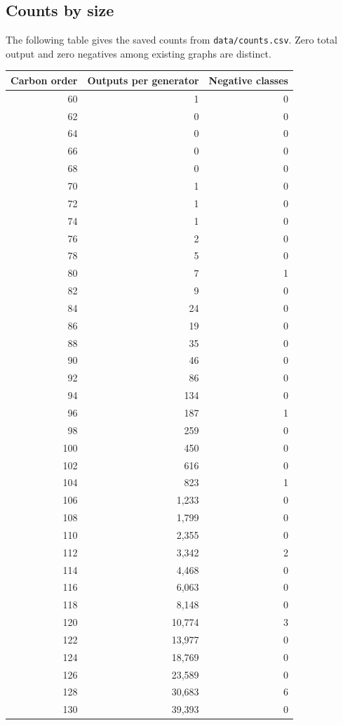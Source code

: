 \documentclass[11pt]{amsart}
\newcommand{\record}[1]{\nolinkurl{#1}}
\begin{document}
\subsection{Counts by size}
The following table gives the saved counts from \record{data/counts.csv}.
Zero total output and zero negatives among existing graphs are distinct.
\begin{longtable}{rrr}
\toprule Carbon order & Outputs per generator & Negative classes\\\midrule\endhead
60 & 1 & 0 \\
62 & 0 & 0 \\
64 & 0 & 0 \\
66 & 0 & 0 \\
68 & 0 & 0 \\
70 & 1 & 0 \\
72 & 1 & 0 \\
74 & 1 & 0 \\
76 & 2 & 0 \\
78 & 5 & 0 \\
80 & 7 & 1 \\
82 & 9 & 0 \\
84 & 24 & 0 \\
86 & 19 & 0 \\
88 & 35 & 0 \\
90 & 46 & 0 \\
92 & 86 & 0 \\
94 & 134 & 0 \\
96 & 187 & 1 \\
98 & 259 & 0 \\
100 & 450 & 0 \\
102 & 616 & 0 \\
104 & 823 & 1 \\
106 & 1,233 & 0 \\
108 & 1,799 & 0 \\
110 & 2,355 & 0 \\
112 & 3,342 & 2 \\
114 & 4,468 & 0 \\
116 & 6,063 & 0 \\
118 & 8,148 & 0 \\
120 & 10,774 & 3 \\
122 & 13,977 & 0 \\
124 & 18,769 & 0 \\
126 & 23,589 & 0 \\
128 & 30,683 & 6 \\
130 & 39,393 & 0 \\

\end{longtable}
\end{document}
